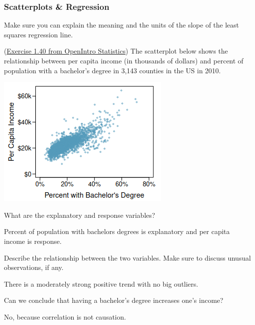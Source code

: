 \documentclass[12pt,answers]{exam}
\newcounter{countA}
\begin{document}
\subsubsection*{Scatterplots \& Regression}

Make sure you can explain the meaning and the units of the slope of the least squares regression line.

\begin{questions}
\setcounter{question}{\value{countA}}

\question (\href{http://people.hsc.edu/faculty-staff/blins/books/OpenIntroStats4e.pdf\#eoce.1.40}{Exercise 1.40 from OpenIntro Statistics}) The scatterplot below shows the relationship between per capita income (in thousands of dollars) and percent of population with a bachelor's degree in 3{,}143 counties in the US in 2010.

\begin{center}
\includegraphics[scale=0.6]{percapitaIncome.png}
\end{center}

\begin{parts}
\item What are the explanatory and response variables?
\begin{solution}
Percent of population with bachelors degrees is explanatory and per capita income is response.
\end{solution}
\bigskip

\item Describe the relationship between the two variables. Make sure to discuss unusual observations, if any.
\begin{solution}
There is a moderately strong positive trend with no big outliers.
\end{solution}
\bigskip

\item Can we conclude that having a bachelor's degree increases one's income?
\begin{solution}
No, because correlation is not causation.
\end{solution}
\bigskip


\end{parts}
\end{questions}
\end{document}
